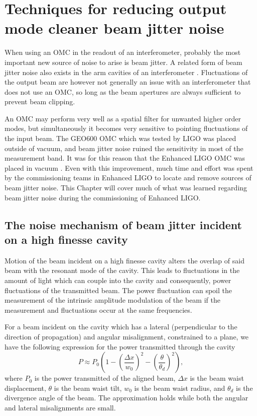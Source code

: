 \chapter{Techniques for reducing output mode cleaner beam jitter noise}
\label{ch:jitter}
When using an OMC in the readout of an interferometer, probably the most important new source of noise to arise is beam jitter. %
A related form of beam jitter noise also exists in the arm cavities of an interferometer \cite{Kawamura:94}. %
Fluctuations of the output beam are however not generally an issue with an interferometer that does not use an OMC, so long as the beam apertures are always sufficient to prevent beam clipping. %


An OMC may perform very well as a spatial filter for unwanted higher order modes, but simultaneously it becomes very sensitive to pointing fluctuations of the input beam. %
The GEO600 OMC which was tested by LIGO was placed outside of vacuum, and beam jitter noise ruined the sensitivity in most of the measurement band. %
It was for this reason that the Enhanced LIGO OMC was placed in vacuum \cite{G040326}. %
Even with this improvement, much time and effort was spent by the commissioning teams in Enhanced LIGO to locate and remove sources of beam jitter noise. %
This Chapter will cover much of what was learned regarding beam jitter noise during the commissioning of Enhanced LIGO.

\section{The noise mechanism of beam jitter incident on a high finesse cavity}

Motion of the beam incident on a high finesse cavity alters the overlap of said beam with the resonant mode of the cavity. %
This leads to fluctuations in the amount of light which can couple into the cavity and consequently, power fluctuations of the transmitted beam. %
The power fluctuation can spoil the measurement of the intrinsic amplitude modulation of the beam if the measurement and fluctuations occur at the same frequencies.

For a beam incident on the cavity which has a lateral (perpendicular to the direction of propagation) and angular misalignment, constrained to a plane, we have the following expression for the power transmitted through the cavity
\begin{equation}
\label{eqn:simplejitter}
P\approx P_0\left(1-\left(\frac{\Delta x}{w_0}\right)^2-\left(\frac{\theta}{\theta_d}\right)^2\right),
\end{equation}
where $P_0$ is the power transmitted of the aligned beam, $\Delta x$ is the beam waist displacement, $\theta$ is the beam waist tilt, $w_0$ is the beam waist radius, and $\theta_d$ is the divergence angle of the beam. %
The approximation holds while both the angular and lateral misalignments are small.

